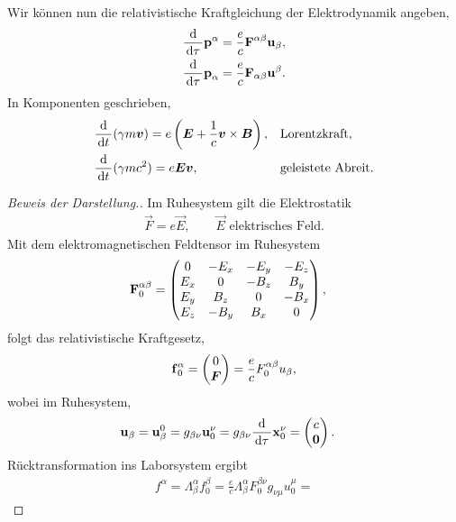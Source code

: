 \begin{bsp}
Wir können nun die relativistische Kraftgleichung der Elektrodynamik
angeben,
\begin{align*}
&\frac{\mathrm{d}}{\,\mathrm{d} \tau\,}\bm{\mathrm{p}}^\alpha =
\frac{e}{c}\bm{\mathrm{F}}^{\alpha\beta}\bm{\mathrm{u}}_\beta,\\
&\frac{\mathrm{d}}{\,\mathrm{d} \tau\,}\bm{\mathrm{p}}_\alpha =
\frac{e}{c}\bm{\mathrm{F}}_{\alpha\beta}\bm{\mathrm{u}}^\beta.
\end{align*}
In Komponenten geschrieben,
\begin{align*}
&\frac{\mathrm{d}}{\,\mathrm{d} t\,}(\gamma m\bm{v}) = e\left(\bm{E} + \frac{1}{c}
\bm{v}\times\bm{B}\right), && \text{Lorentzkraft},\\
&\frac{\mathrm{d}}{\,\mathrm{d} t\,}(\gamma mc^2) = e\bm{E}\bm{v}, &&\text{geleistete
Abreit}.
\end{align*}
\begin{proof}[Beweis der Darstellung.]
Im Ruhesystem gilt die Elektrostatik
\begin{align*}
\vec{F} = e\vec{E},\qquad \vec{E}\text{ elektrisches Feld}.
\end{align*}
Mit dem elektromagnetischen Feldtensor im Ruhesystem
\begin{align*}
&\bm{\mathrm{F}}_0^{\alpha\beta} = 
\begin{pmatrix}
0 & -E_x & -E_y & -E_z\\
E_x & 0 & -B_z & B_y\\
E_y & B_z & 0 & -B_x\\
E_z & -B_y & B_x & 0
\end{pmatrix},
\end{align*}
folgt das relativistische Kraftgesetz,
\begin{align*}
\bm{\mathrm{f}}_0^\alpha =
\begin{pmatrix}
0\\\bm{F}
\end{pmatrix}
= \frac{e}{c}F_0^{\alpha\beta} u_\beta,
\end{align*}
wobei im Ruhesystem,
\begin{align*}
&\bm{\mathrm{u}}_\beta = \bm{\mathrm{u}}_\beta^0 = g_{\beta\nu}\bm{\mathrm{u}}_0^\nu =
g_{\beta\nu}\frac{\mathrm{d}}{\,\mathrm{d} \tau\,}\bm{\mathrm{x}}_0^\nu =
\begin{pmatrix}c\\\bm{0}\end{pmatrix}.
\end{align*}
Rücktransformation ins Laborsystem ergibt
\begin{align*}
f^\alpha =
\Lambda_\beta^\alpha f_0^\beta = \frac{e}{c}\Lambda_\beta^\alpha F_0^{\beta\nu}
g_{\nu\mu} u_0^\mu = 

\end{align*}
\end{proof}
\end{bsp}
